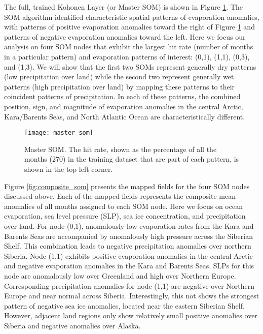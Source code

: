 The full, trained Kohonen Layer (or Master SOM) is shown in Figure \ref{fig:master_som}.
The SOM algorithm identified characteristic spatial patterns of evaporation anomalies, with patterns of positive evaporation anomalies toward the right of Figure \ref{fig:master_som} and patterns of negative evaporation anomalies toward the left.
Here we focus our analysis on four SOM nodes that exhibit the largest hit rate (number of months in a particular pattern) and evaporation patterns of interest: (0,1), (1,1), (0,3), and (1,3).
We will show that the first two SOMs represent generally dry patterns (low precipitation over land) while the second two represent generally wet patterns (high precipitation over land) by mapping these patterns to their coincident patterns of precipitation.
In each of these patterns, the combined position, sign, and magnitude of evaporation anomalies in the central Arctic, Kara/Barents Seas, and North Atlantic Ocean are characteristically different.

\begin{figure}
  \centering
  \texttt{[image: master\_som]}
  \caption{Master SOM. The hit rate, shown as the percentage of all the months (270) in the training dataset that are part of each pattern, is shown in the top left corner.}
  \label{fig:master_som}
\end{figure}

Figure \ref{fig:composite_som} presents the mapped fields for the four SOM nodes discussed above.
Each of the mapped fields represents the composite mean anomalies of all months assigned to each SOM node.
Here we focus on ocean evaporation, sea level pressure (SLP), sea ice concentration, and precipitation over land.
For node (0,1), anomalously low evaporation rates from the Kara and Barents Seas are accompanied by anomalously high pressure across the Siberian Shelf.
This combination leads to negative precipitation anomalies over northern Siberia.
Node (1,1) exhibits positive evaporation anomalies in the central Arctic and negative evaporation anomalies in the Kara and Barents Seas.
SLPs for this node are anomalously low over Greenland and high over Northern Europe.
Corresponding precipitation anomalies for node (1,1) are negative over Northern Europe and near normal across Siberia.
Interestingly, this not shows the strongest pattern of negative sea ice anomalies, located near the eastern Siberian Shelf.
However, adjacent land regions only show relatively small positive anomalies over Siberia and negative anomalies over Alaska.


